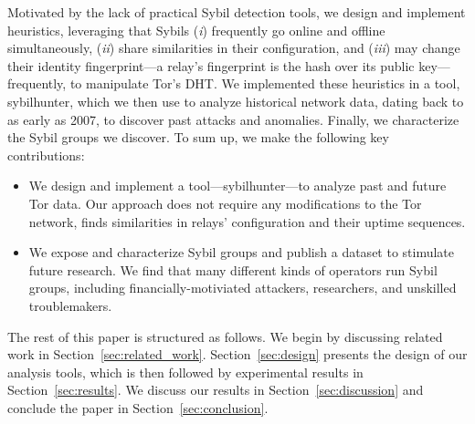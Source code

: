 Motivated by the lack of practical Sybil detection tools, we design and
implement heuristics, leveraging that Sybils (\emph{i}) frequently go online and
offline simultaneously, (\emph{ii}) share similarities in their configuration,
and (\emph{iii}) may change their identity fingerprint---a relay's fingerprint
is the hash over its public key---frequently, to manipulate Tor's DHT.  We
implemented these heuristics in a tool, sybilhunter, which we then use to
analyze historical network data, dating back to as early as 2007, to discover
past attacks and anomalies.  Finally, we characterize the Sybil groups we
discover.  To sum up, we make the following key contributions:
\begin{itemize}
	\item We design and implement a tool---sybilhunter---to analyze past and
		future Tor data.  Our approach does not require any modifications to the
		Tor network, finds similarities in relays' configuration and their
		uptime sequences.
	\item We expose and characterize Sybil groups and publish a dataset to
		stimulate future research.  We find that many different kinds of
		operators run Sybil groups, including financially-motiviated attackers,
		researchers, and unskilled troublemakers.
\end{itemize}

The rest of this paper is structured as follows.  We begin by discussing
related work in Section~\ref{sec:related_work}.  Section~\ref{sec:design}
presents the design of our analysis tools, which is then followed by
experimental results in Section~\ref{sec:results}.  We discuss our results in
Section~\ref{sec:discussion} and conclude the paper in
Section~\ref{sec:conclusion}.
